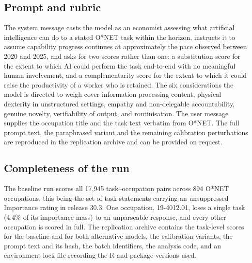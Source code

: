 \subsection{Prompt and rubric}

The system message casts the model as an economist assessing what artificial intelligence can do to a stated O*NET task within the horizon, instructs it to assume capability progress continues at approximately the pace observed between 2020 and 2025, and asks for two scores rather than one: a substitution score for the extent to which AI could perform the task end-to-end with no meaningful human involvement, and a complementarity score for the extent to which it could raise the productivity of a worker who is retained. The six considerations the model is directed to weigh cover information-processing content, physical dexterity in unstructured settings, empathy and non-delegable accountability, genuine novelty, verifiability of output, and routinisation. The user message supplies the occupation title and the task text verbatim from O*NET. The full prompt text, the paraphrased variant and the remaining calibration perturbations are reproduced in the replication archive and can be provided on request.

\subsection{Completeness of the run}

The baseline run scores all 17,945 task--occupation pairs across 894 O*NET occupations, this being the set of task statements carrying an unsuppressed Importance rating in release 30.3. One occupation, 19-4012.01, loses a single task (4.4\% of its importance mass) to an unparseable response, and every other occupation is scored in full. The replication archive contains the task-level scores for the baseline and for both alternative models, the calibration variants, the prompt text and its hash, the batch identifiers, the analysis code, and an environment lock file recording the R and package versions used.